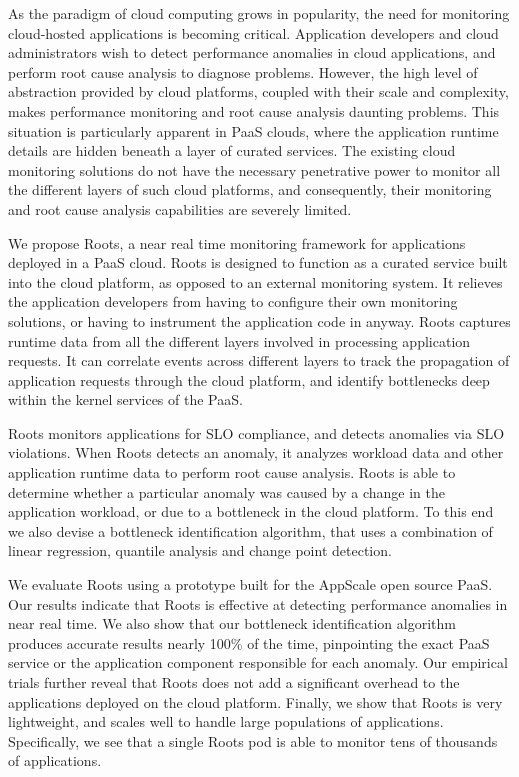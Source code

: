 As the paradigm of cloud computing grows in popularity, the need for monitoring cloud-hosted 
applications is becoming critical. Application developers and cloud administrators
wish to detect performance anomalies in cloud applications, and
perform root cause analysis to diagnose problems. However, the high level of abstraction provided by cloud
platforms, coupled with their scale and complexity, makes performance monitoring and
root cause analysis daunting problems. This situation is particularly apparent in
PaaS clouds, where the application runtime details are hidden beneath a layer of curated services.
The existing cloud monitoring solutions do not have the necessary penetrative power
to monitor all the different layers of such cloud platforms, and consequently, their monitoring
and root cause analysis capabilities are severely limited.

We propose Roots, a near real time monitoring framework for applications deployed in a PaaS cloud. 
Roots is designed to function as a curated service
built into the cloud platform, as opposed to an external monitoring system. 
It relieves the application developers from having to configure
their own monitoring solutions, or having to instrument the application code in anyway.
Roots captures runtime data from all the different layers involved
in processing application requests. It can correlate events across different layers
to track the propagation of application requests through the cloud platform, and
identify bottlenecks deep within the kernel services of the PaaS.

Roots monitors applications for SLO compliance, and detects anomalies via SLO violations.
When Roots detects an anomaly, 
it analyzes workload data and other application runtime data
to perform root cause analysis. Roots is able to determine whether a particular
anomaly was caused by a change in the application workload, or due to a bottleneck
in the cloud platform. To this end we also devise a bottleneck identification algorithm, that
uses a combination of linear regression, quantile analysis and change point detection.

We evaluate Roots using a prototype built for the AppScale open source PaaS. 
Our results indicate that Roots is effective at detecting performance anomalies
in near real time. We also show that our bottleneck identification algorithm
produces accurate results nearly 100\% of the time, pinpointing the exact PaaS
service or the application component responsible for each anomaly. Our empirical trials further 
reveal that Roots does not add a significant overhead to the applications deployed
on the cloud platform. Finally, we show that Roots is very lightweight, 
and scales well to handle large populations of applications. Specifically,
we see that a single Roots pod is able to monitor tens of thousands of applications.

